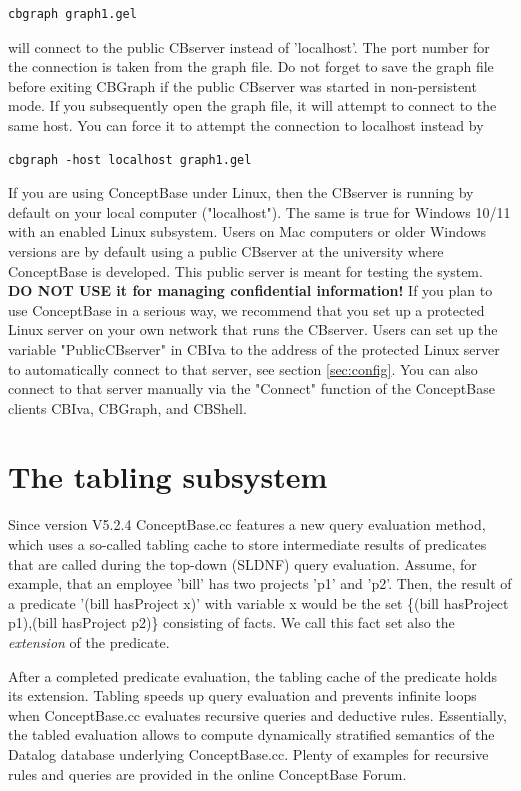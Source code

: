 \begin{verbatim}
cbgraph graph1.gel 
\end{verbatim}

will connect to the public CBserver instead of 'localhost'. The port number for the connection is taken
from the graph file.
Do not forget to save the graph file before exiting CBGraph if the public CBserver was started
in non-persistent mode.
If you subsequently open the graph file, it will attempt to connect to the same host.
You can force it to attempt the connection to localhost instead by

\begin{verbatim}
cbgraph -host localhost graph1.gel 
\end{verbatim}

If you are using ConceptBase under Linux, then the CBserver is running by default on your local computer
("localhost"). The same is true for Windows 10/11 with an enabled Linux subsystem. Users on Mac
computers or older Windows versions are by default using a public CBserver at the university where
ConceptBase is developed. This public server is meant for testing the system. {\bf DO NOT USE it for
managing confidential information!} If you plan to use ConceptBase in a serious way, we
recommend that you set up a protected Linux server on your own network that runs the CBserver.
Users can set up the variable "PublicCBserver" in CBIva to the address of the protected Linux server
to automatically connect to that server, see section \ref{sec:config}. You can also connect to that
server manually via the "Connect" function of the ConceptBase clients CBIva, CBGraph, and CBShell.




\section{The tabling subsystem}
\label{sec:cbcache}

Since version V5.2.4 ConceptBase.cc features a new query evaluation method,
which uses a so-called tabling cache to store intermediate results of predicates
that are called during the top-down (SLDNF) query evaluation. Assume, for example, that
an employee 'bill' has two projects 'p1' and 'p2'. Then, the
result of a predicate '(bill hasProject x)' with variable x would be
the set \{(bill hasProject p1),(bill hasProject p2)\} consisting of facts. 
We call this fact set also the {\em extension} of the predicate.

After a completed predicate evaluation, the tabling cache of the predicate holds
its extension. Tabling speeds up query evaluation and
prevents infinite loops when ConceptBase.cc evaluates
recursive queries and deductive rules. Essentially, the
tabled evaluation allows to compute dynamically stratified
semantics of the Datalog database underlying ConceptBase.cc.
Plenty of examples for recursive rules and queries are provided
in the online ConceptBase Forum.

